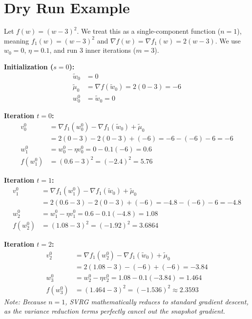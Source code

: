 \documentclass[11pt]{article}
\begin{document}
\section*{Dry Run Example}
Let $f(w) = (w-3)^2$. We treat this as a single-component function ($n=1$), meaning $f_1(w) = (w-3)^2$ and $\nabla f(w) = \nabla f_1(w) = 2(w-3)$. We use $w_0 = 0$, $\eta = 0.1$, and run 3 inner iterations ($m=3$).

\textbf{Initialization ($s=0$):}
\begin{align*}
    \tilde{w}_0 &= 0 \\
    \tilde{\mu}_0 &= \nabla f(\tilde{w}_0) = 2(0-3) = -6 \\
    w_0^0 &= \tilde{w}_0 = 0
\end{align*}

\textbf{Iteration $t=0$:}
\begin{align*}
    v_0^0 &= \nabla f_1(w_0^0) - \nabla f_1(\tilde{w}_0) + \tilde{\mu}_0 \\
          &= 2(0-3) - 2(0-3) + (-6) = -6 - (-6) - 6 = -6 \\
    w_1^0 &= w_0^0 - \eta v_0^0 = 0 - 0.1(-6) = 0.6 \\
    f(w_1^0) &= (0.6 - 3)^2 = (-2.4)^2 = 5.76
\end{align*}

\textbf{Iteration $t=1$:}
\begin{align*}
    v_1^0 &= \nabla f_1(w_1^0) - \nabla f_1(\tilde{w}_0) + \tilde{\mu}_0 \\
          &= 2(0.6-3) - 2(0-3) + (-6) = -4.8 - (-6) - 6 = -4.8 \\
    w_2^0 &= w_1^0 - \eta v_1^0 = 0.6 - 0.1(-4.8) = 1.08 \\
    f(w_2^0) &= (1.08 - 3)^2 = (-1.92)^2 = 3.6864
\end{align*}

\textbf{Iteration $t=2$:}
\begin{align*}
    v_2^0 &= \nabla f_1(w_2^0) - \nabla f_1(\tilde{w}_0) + \tilde{\mu}_0 \\
          &= 2(1.08-3) - (-6) + (-6) = -3.84 \\
    w_3^0 &= w_2^0 - \eta v_2^0 = 1.08 - 0.1(-3.84) = 1.464 \\
    f(w_3^0) &= (1.464 - 3)^2 = (-1.536)^2 \approx 2.3593
\end{align*}
\textit{Note: Because $n=1$, SVRG mathematically reduces to standard gradient descent, as the variance reduction terms perfectly cancel out the snapshot gradient.}
\end{document}
